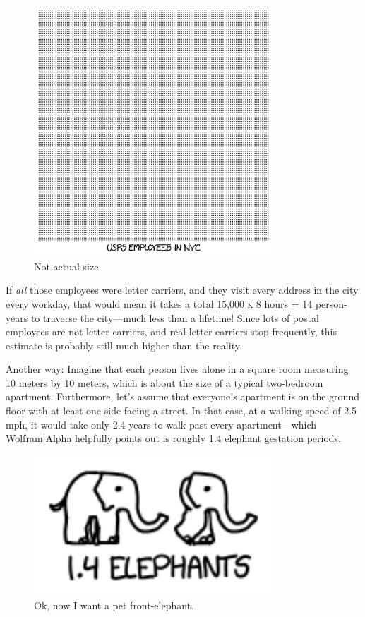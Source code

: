 {\begin{figure}[!htbp]
\centering
\includegraphics[scale=0.5, max width=0.8\textwidth]{imgs/a/110/postal.png}
\caption{Not actual size.}
\end{figure}

{If \emph{all} those employees were letter carriers, and they visit every address in the city every workday, that would mean it takes a total 15,000 x 8 hours = 14 person-years to traverse the city—much less than a lifetime! Since lots of postal employees are not letter carriers, and real letter carriers stop frequently, this estimate is probably still much higher than the reality.}

{Another way: Imagine that each person lives alone in a square room measuring 10 meters by 10 meters, which is about the size of a typical two-bedroom apartment. Furthermore, let's assume that everyone's apartment is on the ground floor with at least one side facing a street. In that case, at a walking speed of 2.5 mph, it would take only 2.4 years to walk past every apartment—which Wolfram|Alpha \href{http://www.wolframalpha.com/input/?i=10+meters+*+8.5+million+\%2F+\%282.5+mph\%29}{helpfully points out} is roughly 1.4 elephant gestation periods.}

\begin{figure}[!htbp]
\centering
\includegraphics[scale=0.5, max width=0.8\textwidth]{imgs/a/110/elephants.png}
\caption{Ok, now I want a pet front-elephant.}
\end{figure}

}
